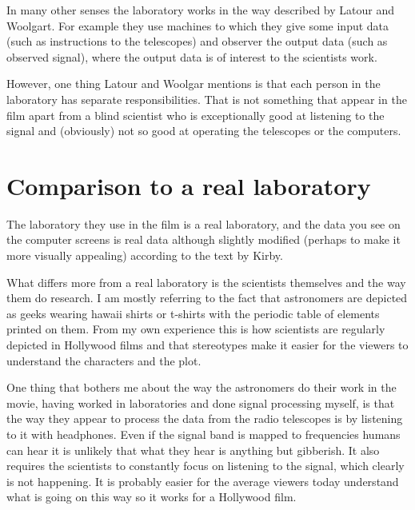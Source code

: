 \documentclass[12pt,a4paper]{IEEEtran}
\begin{document}
In many other senses the laboratory works in the way described by Latour and Woolgart. For example they use machines to which they give some input data (such as instructions to the telescopes) and observer the output data (such as observed signal), where the output data is of interest to the scientists work.

However, one thing Latour and Woolgar mentions is that each person in the laboratory has separate responsibilities. That is not something that appear in the film apart from a blind scientist who is exceptionally good at listening to the signal and (obviously) not so good at operating the telescopes or the computers.

\section{Comparison to a real laboratory}
The laboratory they use in the film is a real laboratory, and the data you see on the computer screens is real data although slightly modified (perhaps to make it more visually appealing) according to the text by Kirby.

What differs more from a real laboratory is the scientists themselves and the way them do research. I am mostly referring to the fact that astronomers are depicted as geeks wearing hawaii shirts or t-shirts with the periodic table of elements printed on them. From my own experience this is how scientists are regularly depicted in Hollywood films and that stereotypes make it easier for the viewers to understand the characters and the plot.

One thing that bothers me about the way the astronomers do their work in the movie, having worked in laboratories and done signal processing myself, is that the way they appear to process the data from the radio telescopes is by listening to it with headphones. Even if the signal band is mapped to frequencies humans can hear it is unlikely that what they hear is anything but gibberish. It also requires the scientists to constantly focus on listening to the signal, which clearly is not happening. It is probably easier for the average viewers today understand what is going on this way so it works for a Hollywood film.
\end{document}
